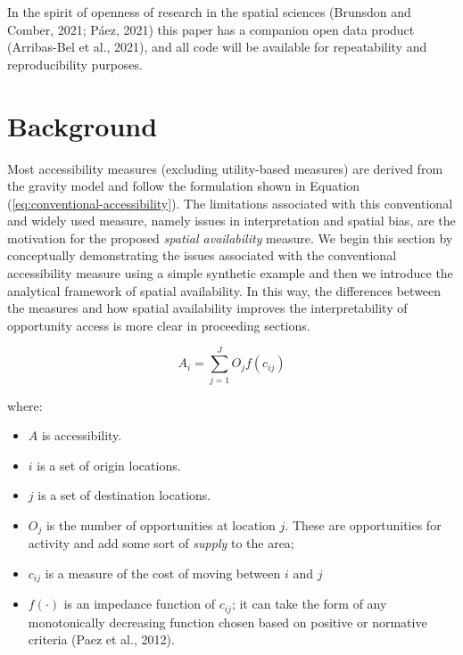 \documentclass[]{elsarticle} %
\providecommand{\tightlist}{%
  \setlength{\itemsep}{0pt}\setlength{\parskip}{0pt}}
\begin{document}
In the spirit of openness of research in the spatial sciences (Brunsdon
and Comber, 2021; Páez, 2021) this paper has a companion open data
product (Arribas-Bel et al., 2021), and all code will be available for
repeatability and reproducibility purposes.

\hypertarget{background}{%
\section{Background}\label{background}}

Most accessibility measures (excluding utility-based measures) are
derived from the gravity model and follow the formulation shown in
Equation (\ref{eq:conventional-accessibility}). The limitations
associated with this conventional and widely used measure, namely issues
in interpretation and spatial bias, are the motivation for the proposed
\emph{spatial availability} measure. We begin this section by
conceptually demonstrating the issues associated with the conventional
accessibility measure using a simple synthetic example and then we
introduce the analytical framework of spatial availability. In this way,
the differences between the measures and how spatial availability
improves the interpretability of opportunity access is more clear in
proceeding sections.

\begin{equation}
\label{eq:conventional-accessibility}
A_i = \sum_{j=1}^JO_jf(c_{ij})
\end{equation}

\noindent where:

\begin{itemize}
\tightlist
\item
  \(A\) is accessibility.
\item
  \(i\) is a set of origin locations.
\item
  \(j\) is a set of destination locations.
\item
  \(O_j\) is the number of opportunities at location \(j\). These are
  opportunities for activity and add some sort of \emph{supply} to the
  area;
\item
  \(c_{ij}\) is a measure of the cost of moving between \(i\) and \(j\)
\item
  \(f(\cdot)\) is an impedance function of \(c_{ij}\); it can take the
  form of any monotonically decreasing function chosen based on positive
  or normative criteria (Paez et al., 2012).
\end{itemize}
\end{document}

